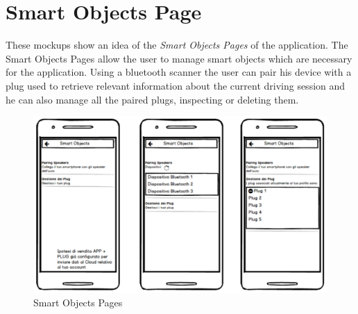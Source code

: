 \clearpage
\section{Smart Objects Page}
These mockups show an idea of the \textit{Smart Objects Pages} of the application. The Smart Objects Pages allow the user to manage smart objects which are necessary for the application. Using a bluetooth scanner the user can pair his device with a plug used to retrieve relevant information about the current driving session and he can also manage all the paired plugs, inspecting or deleting them.\\

\begin{figure}[htbp]
\centering
\includegraphics[width=\textwidth]{cpt/img/SmartObjectsPage.png}
\caption{Smart Objects Pages}
\end{figure}